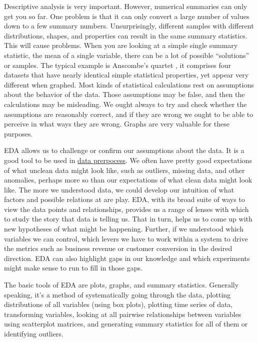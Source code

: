 \documentclass[
]{book}
\begin{document}
Descriptive analysis is very important. However, numerical summaries can only get you so far. One problem is that it can only convert a large number of values down to a few summary numbers. Unsurprisingly, different samples with different distributions, shapes, and properties can result in the same summary statistics. This will cause problems. When you are looking at a simple single summary statistic, the mean of a single variable, there can be a lot of possible ``solutions'' or samples. The typical example is Anscombe's quartet \citep{Anscombe1973}, it comprises four datasets that have nearly identical simple statistical properties, yet appear very different when graphed. Most kinds of statistical calculations rest on assumptions about the behavior of the data. Those assumptions may be false, and then the calculations may be misleading. We ought always to try and check whether the assumptions are reasonably correct, and if they are wrong we ought to be able to perceive in what ways they are wrong. Graphs are very valuable for these purposes.

EDA allows us to challenge or confirm our assumptions about the data. It is a good tool to be used in \protect\hyperlink{preprocess}{data prerpocess}. We often have pretty good expectations of what unclean data might look like, such as outliers, missing data, and other anomalies, perhaps more so than our expectations of what clean data might look like. The more we understood data, we could develop our intuition of what factors and possible relations at are play. EDA, with its broad suite of ways to view the data points and relationships, provides us a range of lenses with which to study the story that data is telling us. That in turn, helps us to come up with new hypotheses of what might be happening. Further, if we understood which variables we can control, which levers we have to work within a system to drive the metrics such as business revenue or customer conversion in the desired direction. EDA can also highlight gaps in our knowledge and which experiments might make sense to run to fill in those gaps.

The basic tools of EDA are plots, graphs, and summary statistics. Generally speaking, it's a method of systematically going through the data, plotting distributions of all variables (using box plots), plotting time series of data, transforming variables, looking at all pairwise relationships between variables using scatterplot matrices, and generating summary statistics for all of them or identifying outliers.
\end{document}
